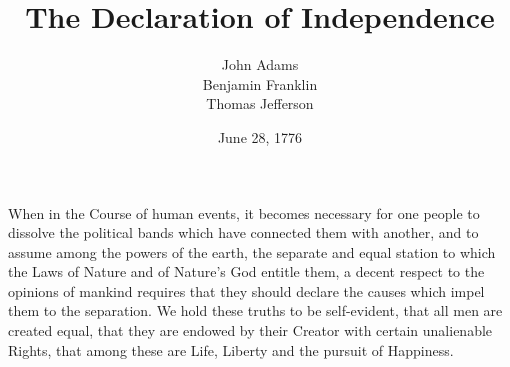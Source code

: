 \documentclass{article}
\title{The Declaration of Independence}
\author{John Adams\\
Benjamin   Franklin\\
Thomas Jefferson}
\date{June 28, 1776}
\begin{document}
\maketitle

When in the Course of human events, it becomes necessary for one
people to dissolve the political bands which have connected them with
another, and to assume among the powers of the earth, the separate and
equal station to which the Laws of Nature and of Nature's God entitle
them, a decent respect to the opinions of mankind requires that they
should declare the causes which impel them to the separation.  We hold
these truths to be self-evident, that all men are created equal, that
they are endowed by their Creator with certain unalienable Rights, that
among these are Life, Liberty and the pursuit of Happiness.
\end{document}
